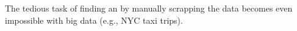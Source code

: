 The tedious task of finding an {\explanation} by manually scrapping the data becomes even impossible with big data (e.g., NYC taxi trips).













